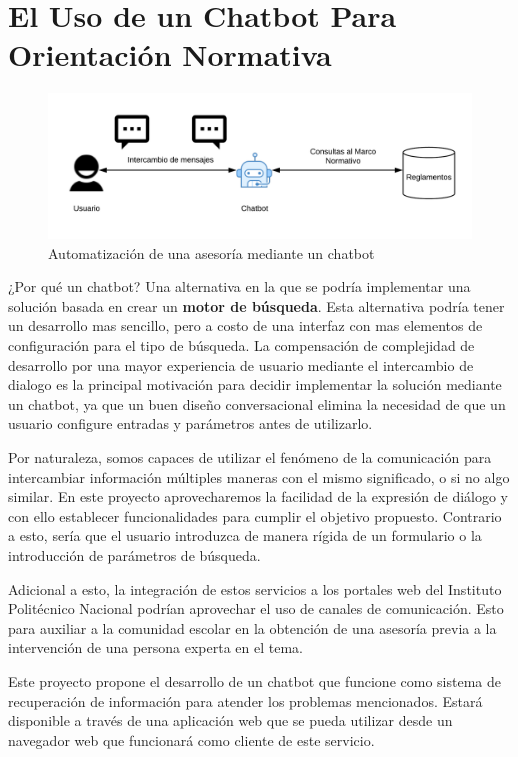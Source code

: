 \section{El Uso de un Chatbot Para Orientación Normativa}

\begin{figure}[ht]
    \centering
    \includegraphics[scale=1]{images/1/propuesta-aplicacion.png}
    \caption{Automatización de una asesoría mediante un chatbot}
    \label{fig:propuesta-aplicacion}
\end{figure}

¿Por qué un chatbot? Una alternativa en la que se podría implementar una solución basada en crear un \textbf{motor de búsqueda}. Esta alternativa podría tener un desarrollo mas sencillo, pero a costo de una interfaz con mas elementos de configuración para el tipo de búsqueda. La compensación de complejidad de desarrollo por una mayor experiencia de usuario mediante el intercambio de dialogo es la principal motivación para decidir implementar la solución mediante un chatbot, ya que un buen diseño conversacional elimina la necesidad de que un usuario configure entradas y parámetros antes de utilizarlo.

Por naturaleza, somos capaces de utilizar el fenómeno de la comunicación para intercambiar información múltiples maneras con el mismo significado, o si no algo similar. En este proyecto aprovecharemos la facilidad de la expresión de diálogo y con ello establecer funcionalidades para cumplir el objetivo propuesto. Contrario a esto, sería que el usuario introduzca de manera rígida de un formulario o la introducción de parámetros de búsqueda.

Adicional a esto, la integración de estos servicios a los portales web del Instituto Politécnico Nacional podrían aprovechar el uso de canales de comunicación. Esto para auxiliar a la comunidad escolar en la obtención de una asesoría previa a la intervención de una persona experta en el tema.

Este proyecto propone el desarrollo de un chatbot que funcione como sistema de recuperación de información para atender los problemas mencionados. Estará disponible a través de una aplicación web que se pueda utilizar desde un navegador web que funcionará como cliente de este servicio.
